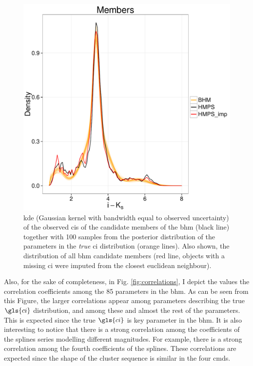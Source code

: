 \begin{figure}[ht!]
    \centering
      \includegraphics[page=1,width=\textwidth]{background/Figures/BHM/Color_members.pdf}
\caption{\gls{kde} (Gaussian kernel with bandwidth equal to observed uncertainty) of the observed \glspl{ci} of the candidate members of the \gls{bhm} (black line) together with 100 samples from the posterior distribution of the parameters in the \emph{true} \gls{ci} distribution (orange lines). Also shown, the distribution of all \gls{bhm} candidate members (red line, objects with a missing \gls{ci} were imputed from the closest euclidean neighbour).}
\label{fig:CI_results}
\end{figure}



Also, for the sake of completeness, in Fig. \ref{fig:correlations}, I depict the values the correlation coefficients among the 85 parameters in the \gls{bhm}. As can be seen from this Figure, the larger correlations appear among parameters describing the true $\gls{ci}$ distribution, and  among these and almost the rest of the parameters. This is expected since the true $\gls{ci}$ is key parameter in the \gls{bhm}. It is also interesting to notice that there is a strong correlation among the coefficients of the splines series modelling different magnitudes. For example, there is a strong correlation among the fourth coefficients of the splines. These correlations are expected since the shape of the cluster sequence is similar in the four \glspl{cmd}.  

